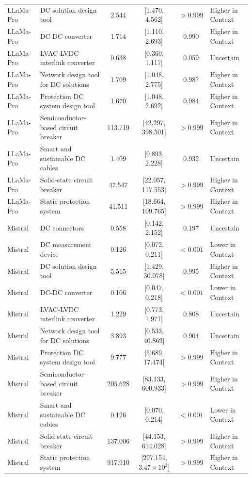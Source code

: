 \begin{longtable}[tbp]{p{2.3cm}p{5.0cm}cccp{3.2cm}}
LLaMa-Pro & DC solution design tool & 2.544 & [1.470, 4.562] & $>0.999$ & Higher in Context \\
LLaMa-Pro & DC-DC converter & 1.714 & [1.110, 2.693] & 0.990 & Higher in Context \\
LLaMa-Pro & LVAC-LVDC interlink converter & 0.638 & [0.360, 1.117] & 0.059 & Uncertain \\
LLaMa-Pro & Network design tool for DC solutions & 1.709 & [1.048, 2.775] & 0.987 & Higher in Context \\
LLaMa-Pro & Protection DC system design tool & 1.670 & [1.048, 2.692] & 0.984 & Higher in Context \\
LLaMa-Pro & Semiconductor-based circuit breaker & 113.719 & [42.297, 398.501] & $>0.999$ & Higher in Context \\
LLaMa-Pro & Smart and sustainable DC cables & 1.409 & [0.893, 2.228] & 0.932 & Uncertain \\
LLaMa-Pro & Solid-state circuit breaker & 47.547 & [22.057, 117.553] & $>0.999$ & Higher in Context \\
LLaMa-Pro & Static protection system & 41.511 & [18.664, 109.765] & $>0.999$ & Higher in Context \\
Mistral & DC connectors & 0.558 & [0.142, 2.152] & 0.197 & Uncertain \\
Mistral & DC measurement device & 0.126 & [0.072, 0.211] & $<0.001$ & Lower in Context \\
Mistral & DC solution design tool & 5.515 & [1.429, 30.078] & 0.995 & Higher in Context \\
Mistral & DC-DC converter & 0.106 & [0.047, 0.218] & $<0.001$ & Lower in Context \\
Mistral & LVAC-LVDC interlink converter & 1.229 & [0.773, 1.971] & 0.808 & Uncertain \\
Mistral & Network design tool for DC solutions & 3.893 & [0.533, 40.869] & 0.904 & Uncertain \\
Mistral & Protection DC system design tool & 9.777 & [5.689, 17.474] & $>0.999$ & Higher in Context \\
Mistral & Semiconductor-based circuit breaker & 205.628 & [83.133, 600.933] & $>0.999$ & Higher in Context \\
Mistral & Smart and sustainable DC cables & 0.126 & [0.070, 0.214] & $<0.001$ & Lower in Context \\
Mistral & Solid-state circuit breaker & 137.006 & [44.153, 614.028] & $>0.999$ & Higher in Context \\
Mistral & Static protection system & 917.910 & [297.154, $3.47\times 10^{3}$] & $>0.999$ & Higher in Context \\

\end{longtable}
